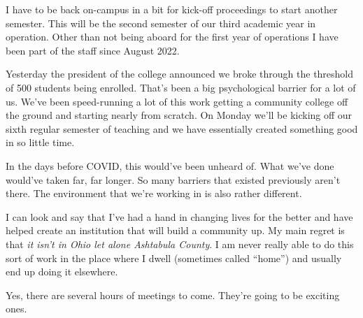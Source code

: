I have to be back on-campus in a bit for kick-off proceedings to start
another semester. This will be the second semester of our third academic
year in operation. Other than not being aboard for the first year of
operations I have been part of the staff since August 2022.

Yesterday the president of the college announced we broke through the
threshold of 500 students being enrolled. That's been a big
psychological barrier for a lot of us. We've been speed-running a lot of
this work getting a community college off the ground and starting nearly
from scratch. On Monday we'll be kicking off our sixth regular semester
of teaching and we have essentially created something good in so little
time.

In the days before COVID, this would've been unheard of. What we've done
would've taken far, far longer. So many barriers that existed previously
aren't there. The environment that we're working in is also rather
different.

I can look and say that I've had a hand in changing lives for the better
and have helped create an institution that will build a community up. My
main regret is that \emph{it isn't in Ohio let alone Ashtabula County}.
I am never really able to do this sort of work in the place where I
dwell (sometimes called ``home'') and usually end up doing it elsewhere.

Yes, there are several hours of meetings to come. They're going to be
exciting ones.
